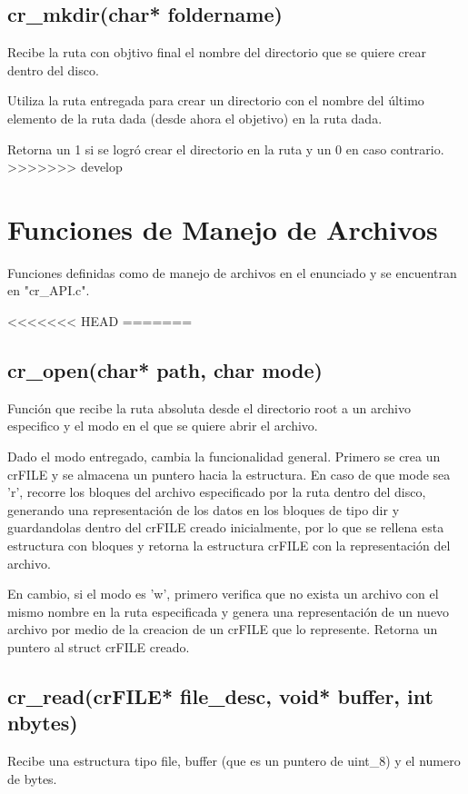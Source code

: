 \documentclass[12pt]{article}
\begin{document}
\subsection{cr\_mkdir(char* foldername)}
Recibe la ruta con objtivo final el nombre del directorio que se quiere crear dentro del disco.

Utiliza la ruta entregada para crear un directorio con el nombre del último elemento de la ruta dada (desde ahora el objetivo) en la ruta dada.

Retorna un 1 si se logró crear el directorio en la ruta y un 0 en caso contrario.
>>>>>>> develop

\section{Funciones de Manejo de Archivos}
Funciones definidas como de manejo de archivos en el enunciado y se encuentran en "cr\_API.c".

<<<<<<< HEAD
=======
\subsection{cr\_open(char* path, char mode)}
Función que recibe la ruta absoluta desde el directorio root a un archivo  especifico y el modo en el que se quiere abrir el archivo.

Dado el modo entregado, cambia la funcionalidad general. Primero se crea un crFILE y se almacena un puntero hacia la estructura. En caso de que mode sea 'r', recorre los bloques del archivo especificado por la ruta dentro del disco, generando una representación de los datos en los bloques de tipo dir y guardandolas dentro del crFILE creado inicialmente, por lo que se rellena esta estructura con bloques y retorna la estructura crFILE con la representación del archivo.

En cambio, si el modo es 'w', primero verifica que no exista un archivo con el mismo nombre en la ruta especificada y genera una representación de un nuevo archivo por medio de la creacion de un crFILE que lo represente. Retorna un puntero al struct crFILE creado.

\subsection{cr\_read(crFILE* file\_desc, void* buffer, int nbytes)}
Recibe una estructura tipo file, buffer (que es un puntero de uint\_8) y el numero de bytes. 
\end{document}

